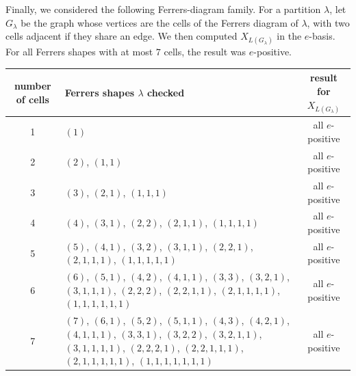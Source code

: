 \documentclass[11pt]{article}
\begin{document}
\bigskip

Finally, we considered the following Ferrers-diagram family. For a partition
\(\lambda\), let \(G_\lambda\) be the graph whose vertices are the cells of the
Ferrers diagram of \(\lambda\), with two cells adjacent if they share an edge.
We then computed \(X_{L(G_\lambda)}\) in the \(e\)-basis. For all Ferrers
shapes with at most \(7\) cells, the result was \(e\)-positive.

\medskip

\small
\begin{center}
\begin{tabular}{c|p{9.5cm}|c}
number of cells & Ferrers shapes \(\lambda\) checked & result for \(X_{L(G_\lambda)}\) \\
\hline
1 & \((1)\) & all \(e\)-positive \\
2 & \((2)\), \((1,1)\) & all \(e\)-positive \\
3 & \((3)\), \((2,1)\), \((1,1,1)\) & all \(e\)-positive \\
4 & \((4)\), \((3,1)\), \((2,2)\), \((2,1,1)\), \((1,1,1,1)\) & all \(e\)-positive \\
5 & \((5)\), \((4,1)\), \((3,2)\), \((3,1,1)\), \((2,2,1)\), \((2,1,1,1)\), \((1,1,1,1,1)\) & all \(e\)-positive \\
6 & \((6)\), \((5,1)\), \((4,2)\), \((4,1,1)\), \((3,3)\), \((3,2,1)\), \((3,1,1,1)\), \((2,2,2)\), \((2,2,1,1)\), \((2,1,1,1,1)\), \((1,1,1,1,1,1)\) & all \(e\)-positive \\
7 & \((7)\), \((6,1)\), \((5,2)\), \((5,1,1)\), \((4,3)\), \((4,2,1)\), \((4,1,1,1)\), \((3,3,1)\), \((3,2,2)\), \((3,2,1,1)\), \((3,1,1,1,1)\), \((2,2,2,1)\), \((2,2,1,1,1)\), \((2,1,1,1,1,1)\), \((1,1,1,1,1,1,1)\) & all \(e\)-positive
\end{tabular}
\end{center}
\normalsize
\end{document}
